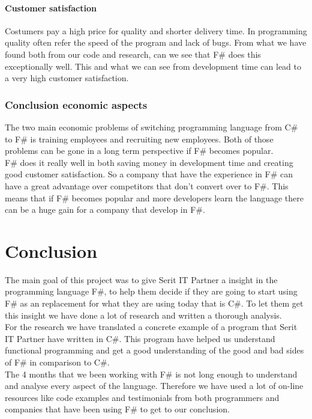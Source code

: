 \documentclass[12pt, a4paper]{article}
\begin{document}
\paragraph{Customer satisfaction}
Costumers pay a high price for quality and shorter delivery time. In programming quality often refer the speed of the program and lack of bugs. From what we have found both from our code and research, can we see that F\# does this exceptionally well. This and what we can see from development time can lead to a very high customer satisfaction.

\newpage
\subsubsection{Conclusion economic aspects}
The two main economic problems of switching programming language from C\# to F\# is training employees and recruiting new employees. Both of those problems can be gone in a long term perspective if F\# becomes popular.\\

F\# does it really well in both saving money in development time and creating good customer satisfaction.  So a company that have the experience in F\# can have a great advantage over competitors that don't convert over to F\#. This means that if F\# becomes popular and more developers learn the language there can be a huge gain for a company that develop in F\#. 

\newpage

\section{Conclusion}
The main goal of this project was to give Serit IT Partner a insight in the programming language F\#, to help them decide if they are going to start using F\# as an replacement for what they are using today that is C\#. To let them get this insight we have done a lot of research and written a thorough analysis.\\

For the research we have translated a concrete example of a program that Serit IT Partner have written in C\#. This program have helped us understand functional programming and get a good understanding of the good and bad sides of F\# in comparison to C\#.\\

The 4 months that we been working with F\# is not long enough to understand and analyse every aspect of the language. Therefore we have used a lot of on-line resources like code examples and testimonials from both programmers and companies that have been using F\# to get to our conclusion.\\
\end{document}
